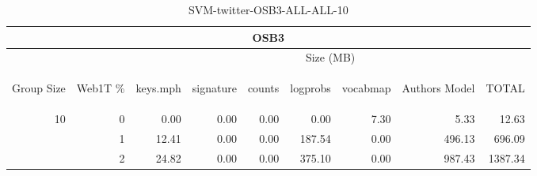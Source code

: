 \begin{center}
\begin{table}[htbp] 
 \begin{center}
\begin{tabular}{ | r | r | r | r | r | r | r | r | r |}
\hline
\multicolumn{9}{|c|}{OSB3}\\
\hline
 & & \multicolumn{7}{|c|}{Size (MB)}\\ \cline{3-9}
\begin{sideways}Group Size\end{sideways} & \begin{sideways}Web1T \% \end{sideways} & \begin{sideways}keys.mph\end{sideways} & \begin{sideways}signature\end{sideways} & \begin{sideways}counts\end{sideways} & \begin{sideways}logprobs\end{sideways} & \begin{sideways}vocabmap\end{sideways} & \begin{sideways}Authors Model \end{sideways} & \begin{sideways}TOTAL\end{sideways}\\
\hline
\multirow{2}{*}{10}
 & 0 & 0.00 & 0.00 & 0.00 & 0.00 & 7.30 & 5.33 & 12.63\\ \cline{2-9}
 & 1 & 12.41 & 0.00 & 0.00 & 187.54 & 0.00 & 496.13 & 696.09\\ \cline{2-9}
 & 2 & 24.82 & 0.00 & 0.00 & 375.10 & 0.00 & 987.43 & 1387.34\\ \cline{2-9}
\hline
\end{tabular}
\caption{SVM-twitter-OSB3-ALL-ALL-10}
\label{table:SVM-twitter-OSB3-ALL-ALL-10}
\end{center}
 \end{table}
\end{center}

